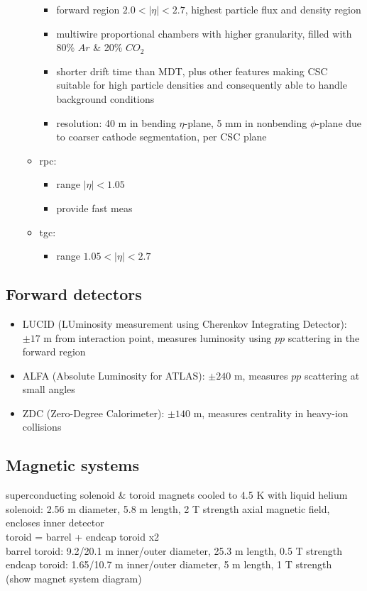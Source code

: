 \documentclass[../thesis.tex]{subfiles}
\begin{document}
\begin{itemize}
\begin{multicols}{2}
\begin{itemize}
	\begin{itemize}
	\item forward region $2.0<|\eta|<2.7$, highest particle flux and density region
	\item multiwire proportional chambers with higher granularity, filled with 80\% $Ar$ \& 20\% $CO_2$
	\item shorter drift time than MDT, plus other features making CSC suitable for high particle densities and consequently able to handle background conditions
	\item resolution: 40 \textmu m in bending $\eta$-plane, 5 mm in nonbending $\phi$-plane due to coarser cathode segmentation, per CSC plane
	\end{itemize}
	
\columnbreak
\item rpc:
	\begin{itemize}
	\item range $|\eta|<1.05$
	\item provide fast meas
	\end{itemize}
\item tgc:
	\begin{itemize}
	\item range $1.05<|\eta|<2.7$
	\end{itemize}
\end{itemize}
\end{multicols}
\end{itemize}

\subsection{Forward detectors}
\begin{itemize}
\item LUCID (LUminosity measurement using Cherenkov Integrating Detector): $\pm 17$ m from interaction point, measures luminosity using $pp$ scattering in the forward region
\item ALFA (Absolute Luminosity for ATLAS): $\pm 240$ m, measures $pp$ scattering at small angles
\item ZDC (Zero-Degree Calorimeter): $\pm 140$ m, measures centrality in heavy-ion collisions
\end{itemize}

\subsection{Magnetic systems}
superconducting solenoid \& toroid magnets cooled to 4.5 K with liquid helium\\
solenoid: 2.56 m diameter, 5.8 m length, 2 T strength axial magnetic field, encloses inner detector\\
toroid = barrel + endcap toroid x2\\
barrel toroid: 9.2/20.1 m inner/outer diameter, 25.3 m length, 0.5 T strength\\
endcap toroid: 1.65/10.7 m inner/outer diameter, 5 m length, 1 T strength\\
(show magnet system diagram)
\end{document}
